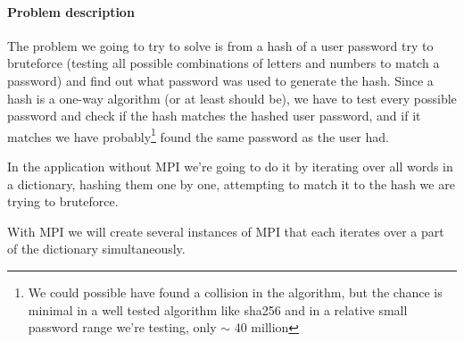 \documentclass{article}
\begin{document}
\paragraph{Problem description}
The problem we going to try to solve is from a hash of a user password try to
bruteforce (testing all possible combinations of letters and numbers to match a
password) and find out what password was used to generate the hash.  Since a
hash is a one-way algorithm (or at least should be), we have to test every
possible password and check if the hash matches the hashed user password, and
if it matches we have probably\footnote{We could possible have found a
collision in the algorithm, but the chance is minimal in a well tested
algorithm like sha256 and in a relative small password range we're testing,
only $\sim$ 40 million } found the same password as the user had.

In the application without MPI we're going to do it by iterating over all words
in a dictionary, hashing them one by one, attempting to match it to the hash
we are trying to bruteforce.

With MPI we will create several instances of MPI that each iterates over a part
of the dictionary simultaneously.
\end{document}
